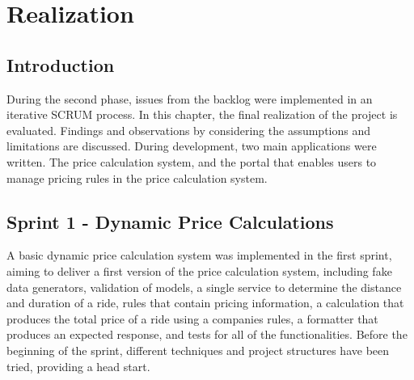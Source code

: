 \graphicspath{{Chapter6/Figs/Vector/}{Chapter6/Figs/}}

%
\chapter{Realization}
\section{Introduction}
During the second phase, issues from the backlog were implemented in an iterative SCRUM process. In this chapter, the final realization of the project is evaluated. Findings and observations by considering the assumptions and limitations are discussed. During development, two main applications were written. The price calculation system, and the portal that enables users to manage pricing rules in the price calculation system.

%
\section{Sprint 1 - Dynamic Price Calculations}
A basic dynamic price calculation system was implemented in the first sprint, aiming to deliver a first version of the price calculation system, including fake data generators, validation of models, a single service to determine the distance and duration of a ride, rules that contain pricing information, a calculation that produces the total price of a ride using a companies rules, a formatter that produces an expected response, and tests for all of the functionalities. Before the beginning of the sprint, different techniques and project structures have been tried, providing a head start.

%
